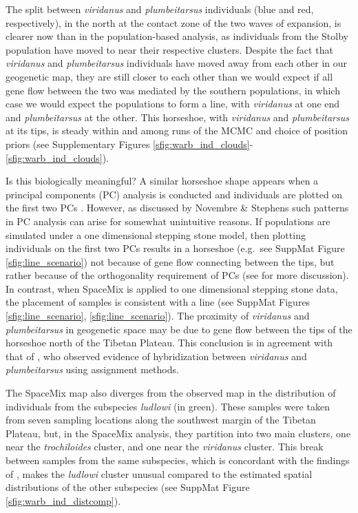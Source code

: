 \documentclass[12pt]{article}
\begin{document}
The split between \textit{viridanus} and \textit{plumbeitarsus} individuals (blue and red, respectively), in the north at the contact zone of the two waves of expansion, is clearer now than in the population-based analysis, as individuals from the Stolby population have moved to near their respective clusters. 
Despite the fact that \textit{viridanus} and \textit{plumbeitarsus} individuals have moved away from each other in our geogenetic map, 
they are still closer to each other than we would expect if all gene flow between the two was mediated by the southern populations,
in which case we would expect the populations to form a line, 
with \textit{viridanus} at one end and \textit{plumbeitarsus} at the other. 
This horseshoe, with \textit{viridanus} and \textit{plumbeitarsus} at its tips, is steady within and among runs of the MCMC and choice of position priors (see Supplementary Figures \ref{sfig:warb_ind_clouds}-\ref{sfig:warb_ind_clouds}).  


Is this biologically meaningful?  A similar horseshoe shape appears when a principal components (PC) analysis is conducted and individuals are plotted on the first two PCs \citep[see SuppMat Figure \ref{sfig:warb_ind_PC_map} and ][]{alcaide2014genomic}.  
However, as discussed by Novembre \& Stephens \citep{novembre_interpreting_2008} such patterns in PC analysis can arise for somewhat unintuitive reasons. If populations are simulated under a one dimensional stepping stone model, then plotting individuals on the first two PCs results in a horseshoe (e.g.\ see SuppMat Figure \ref{sfig:line_scenario}) not because of gene flow connecting between the tips, but rather because of the orthogonality requirement of PCs (see \cite{novembre_interpreting_2008} for more discussion).  In contrast, when SpaceMix is applied to one dimensional stepping stone data, the placement of samples is consistent with a line (see SuppMat Figures \ref{sfig:line_scenario}, \ref{sfig:line_scenario}). The proximity of \textit{viridanus} and \textit{plumbeitarsus} in geogenetic space may be due to gene flow between the tips of the horseshoe north of the Tibetan Plateau. This conclusion is in agreement with that of \citet{alcaide2014genomic}, who observed evidence of hybridization between \textit{viridanus} and \textit{plumbeitarsus} using assignment methods.

The SpaceMix map also diverges from the observed map in the distribution of individuals from the subspecies \textit{ludlowi} (in green).  These samples were taken from seven sampling locations along the southwest margin of the Tibetan Plateau, but, in the SpaceMix analysis, they partition into two main clusters, one near the \textit{trochiloides} cluster, and one near the \textit{viridanus} cluster.  This break between samples from the same subspecies, which is concordant with the findings of \citet{alcaide2014genomic}, makes the \textit{ludlowi} cluster unusual compared to the estimated spatial distributions of the other subspecies (see SuppMat Figure \ref{sfig:warb_ind_distcomp}).
\end{document}
